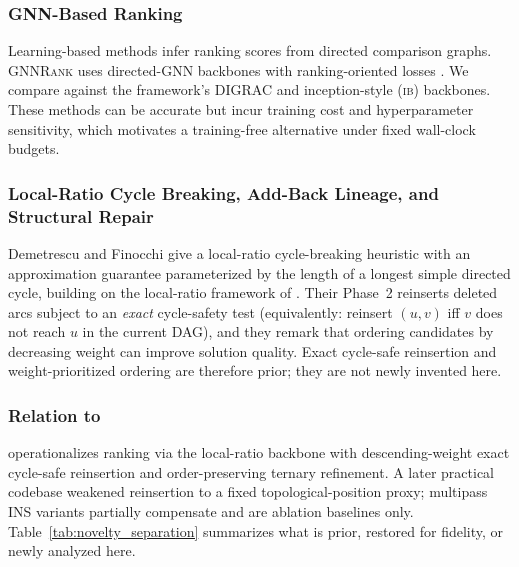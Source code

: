 \documentclass{article}
\begin{document}
\subsubsection{GNN-Based Ranking}
Learning-based methods infer ranking scores from directed comparison graphs. \textsc{GNNRank} uses directed-GNN backbones with ranking-oriented losses \citet{he22}. We compare against the framework's \textsc{DIGRAC} \citet{DIGRAC} and inception-style (\textsc{ib}) \citet{DiGCN} backbones. These methods can be accurate but incur training cost and hyperparameter sensitivity, which motivates a training-free alternative under fixed wall-clock budgets.

\subsubsection{Local-Ratio Cycle Breaking, Add-Back Lineage, and Structural Repair}
Demetrescu and Finocchi \citet{CI03} give a local-ratio cycle-breaking heuristic with an approximation guarantee parameterized by the length of a longest simple directed cycle, building on the local-ratio framework of \citet{BK04}. Their Phase~2 reinserts deleted arcs subject to an \emph{exact} cycle-safety test (equivalently: reinsert $(u,v)$ iff $v$ does not reach $u$ in the current DAG), and they remark that ordering candidates by decreasing weight can improve solution quality. Exact cycle-safe reinsertion and weight-prioritized ordering are therefore prior; they are not newly invented here.

\subsubsection{Relation to \citet{VK25}}
\citet{VK25} operationalizes ranking via the \citet{CI03} local-ratio backbone with descending-weight exact cycle-safe reinsertion and order-preserving ternary refinement.
A later practical codebase weakened reinsertion to a fixed topological-position proxy; multipass INS variants partially compensate and are ablation baselines only.
Table~\ref{tab:novelty_separation} summarizes what is prior, restored for fidelity, or newly analyzed here.
\end{document}
